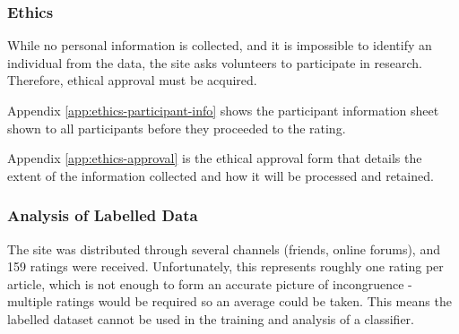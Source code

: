 \subsubsection{Ethics}
 While no personal information is collected, and it is impossible to identify an individual from the data, the site asks volunteers to participate in research. Therefore, ethical approval must be acquired.

Appendix \ref{app:ethics-participant-info} shows the participant information sheet shown to all participants before they proceeded to the rating. 

Appendix \ref{app:ethics-approval} is the ethical approval form that details the extent of the information collected and how it will be processed and retained.

\subsubsection{Analysis of Labelled Data}
The site was distributed through several channels (friends, online forums), and 159 ratings were received. Unfortunately, this represents roughly one rating per article, which is not enough to form an accurate picture of incongruence - multiple ratings would be required so an average could be taken. This means the labelled dataset cannot be used in the training and analysis of a classifier.